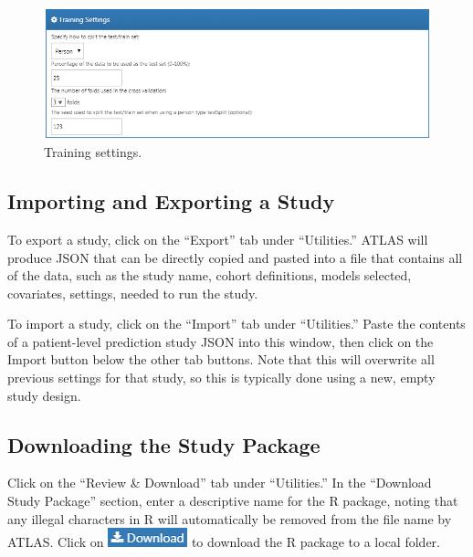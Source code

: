 \documentclass[11pt]{book}
\theoremstyle{definition}
\theoremstyle{definition}
\theoremstyle{definition}
\theoremstyle{remark}
\begin{document}
\begin{figure}

{\centering \includegraphics[width=1\linewidth]{images/PatientLevelPrediction/trainingSettings} 

}

\caption{Training settings.}\label{fig:trainingSettings}
\end{figure}

\subsection{Importing and Exporting a
Study}\label{importing-and-exporting-a-study}

To export a study, click on the ``Export'' tab under ``Utilities.''
ATLAS will produce JSON that can be directly copied and pasted into a
file that contains all of the data, such as the study name, cohort
definitions, models selected, covariates, settings, needed to run the
study.

To import a study, click on the ``Import'' tab under ``Utilities.''
Paste the contents of a patient-level prediction study JSON into this
window, then click on the Import button below the other tab buttons.
Note that this will overwrite all previous settings for that study, so
this is typically done using a new, empty study design.

\subsection{Downloading the Study
Package}\label{downloading-the-study-package}

Click on the ``Review \& Download'' tab under ``Utilities.'' In the
``Download Study Package'' section, enter a descriptive name for the R
package, noting that any illegal characters in R will automatically be
removed from the file name by ATLAS. Click on
\includegraphics{images/PatientLevelPrediction/download.png} to download
the R package to a local folder.
\end{document}
